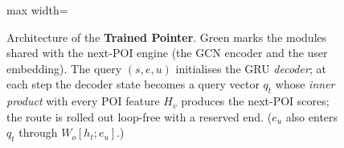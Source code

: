 \begin{figure}[h]
\begin{adjustbox}{max width=\textwidth}
\end{adjustbox}
\caption{Architecture of the \textbf{Trained Pointer}. \textcolor{svGreen}{Green} marks the modules
shared with the next-POI engine (the GCN encoder and the user embedding). The query $(s,e,u)$
initialises the GRU \emph{decoder}; at each step the decoder state becomes a query vector $q_t$ whose
\emph{inner product} with every POI feature $H_v$ produces the next-POI scores; the route is rolled
out loop-free with a reserved end. ($e_u$ also enters $q_t$ through $W_o[h_t;e_u]$.)}
\label{fig:ptr}
\end{figure}
